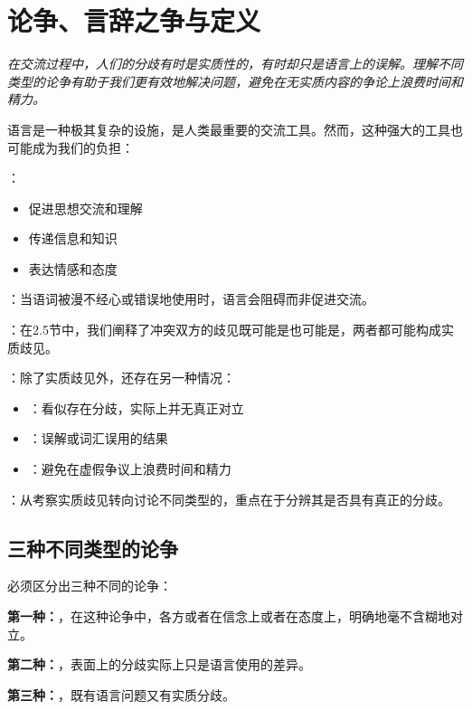 \section{论争、言辞之争与定义}

\begin{logicbox}[title=引言]
\textit{在交流过程中，人们的分歧有时是实质性的，有时却只是语言上的误解。理解不同类型的论争有助于我们更有效地解决问题，避免在无实质内容的争论上浪费时间和精力。}
\end{logicbox}

\begin{theorembox}[title=语言的双重性质]
语言是一种极其复杂的设施，是人类最重要的交流工具。然而，这种强大的工具也可能成为我们的负担：

：
\begin{itemize}
  \item 促进思想交流和理解
  \item 传递信息和知识
  \item 表达情感和态度
\end{itemize}

：当语词被漫不经心或错误地使用时，语言会阻碍而非促进交流。
\end{theorembox}

\begin{theorembox}[title=从歧见到论争的理论发展]
：在2.5节中，我们阐释了冲突双方的歧见既可能是也可能是，两者都可能构成实质歧见。

：除了实质歧见外，还存在另一种情况：
\begin{itemize}
  \item {}：看似存在分歧，实际上并无真正对立
  \item {}：误解或词汇误用的结果
  \item {}：避免在虚假争议上浪费时间和精力
\end{itemize}

：从考察实质歧见转向讨论不同类型的，重点在于分辨其是否具有真正的分歧。
\end{theorembox}

\subsection{三种不同类型的论争}

\begin{theorembox}[title=三种论争类型]
必须区分出三种不同的论争：

\textbf{第一种：}，在这种论争中，各方或者在信念上或者在态度上，明确地毫不含糊地对立。

\textbf{第二种：}，表面上的分歧实际上只是语言使用的差异。

\textbf{第三种：}，既有语言问题又有实质分歧。
\end{theorembox}

